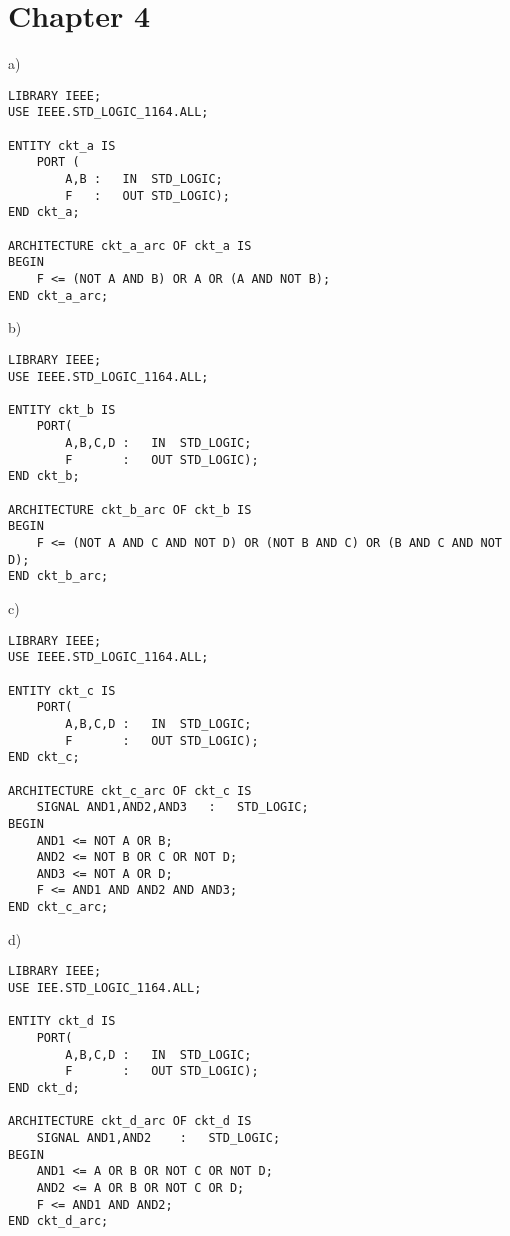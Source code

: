 \section*{Chapter 4}
\begin{enumerate}
	\begin{minipage}{1\linewidth}
	\item a)
		\begin{lstlisting}[]
LIBRARY IEEE;
USE IEEE.STD_LOGIC_1164.ALL;

ENTITY ckt_a IS
	PORT (
		A,B	:	IN	STD_LOGIC;
		F	:	OUT	STD_LOGIC);
END ckt_a;

ARCHITECTURE ckt_a_arc OF ckt_a IS
BEGIN
	F <= (NOT A AND B) OR A OR (A AND NOT B);
END ckt_a_arc;
		\end{lstlisting}
	\end{minipage}

	\begin{minipage}{1\linewidth}

		b)
		\begin{lstlisting}[]
LIBRARY IEEE;
USE IEEE.STD_LOGIC_1164.ALL;

ENTITY ckt_b IS
	PORT(
		A,B,C,D	:	IN	STD_LOGIC;
		F		:	OUT	STD_LOGIC);
END ckt_b;

ARCHITECTURE ckt_b_arc OF ckt_b IS
BEGIN
	F <= (NOT A AND C AND NOT D) OR (NOT B AND C) OR (B AND C AND NOT D);
END ckt_b_arc;
		\end{lstlisting}
	\end{minipage}

	\begin{minipage}{1\linewidth}
		c)
		\begin{lstlisting}[]
LIBRARY IEEE;
USE IEEE.STD_LOGIC_1164.ALL;

ENTITY ckt_c IS
	PORT(
		A,B,C,D	:	IN	STD_LOGIC;
		F		:	OUT	STD_LOGIC);
END ckt_c;

ARCHITECTURE ckt_c_arc OF ckt_c IS
	SIGNAL AND1,AND2,AND3	:	STD_LOGIC;
BEGIN
	AND1 <= NOT A OR B;
	AND2 <= NOT B OR C OR NOT D;
	AND3 <= NOT A OR D;
	F <= AND1 AND AND2 AND AND3;
END ckt_c_arc;
		\end{lstlisting}
	\end{minipage}

	\begin{minipage}{1\linewidth}
		d)
		\begin{lstlisting}[]
LIBRARY IEEE;
USE IEE.STD_LOGIC_1164.ALL;

ENTITY ckt_d IS
	PORT(
		A,B,C,D	:	IN	STD_LOGIC;
		F		:	OUT	STD_LOGIC);
END ckt_d;

ARCHITECTURE ckt_d_arc OF ckt_d IS
	SIGNAL AND1,AND2	:	STD_LOGIC;
BEGIN
	AND1 <= A OR B OR NOT C OR NOT D;
	AND2 <= A OR B OR NOT C OR D;
	F <= AND1 AND AND2;
END ckt_d_arc;
		\end{lstlisting}
	\end{minipage}


\end{enumerate}
